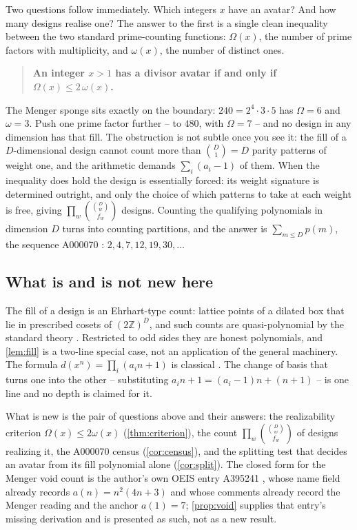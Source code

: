 \documentclass[11pt]{amsart}
\theoremstyle{definition}
\theoremstyle{remark}
\begin{document}
Two questions follow immediately. Which integers $x$ have an avatar? And how many designs realise one? The answer to the first is a single clean inequality between the two standard prime-counting functions: $\Omega(x)$, the number of prime factors with multiplicity, and $\omega(x)$, the number of distinct ones.

\begin{quote}
\textbf{An integer $x>1$ has a divisor avatar if and only if $\Omega(x) \le 2\,\omega(x)$.}
\end{quote}

The Menger sponge sits exactly on the boundary: $240 = 2^{4}\cdot 3 \cdot 5$ has $\Omega = 6$ and $\omega = 3$. Push one prime factor further -- to $480$, with $\Omega = 7$ -- and no design in any dimension has that fill. The obstruction is not subtle once you see it: the fill of a $D$-dimensional design cannot count more than $\binom{D}{1}=D$ parity patterns of weight one, and the arithmetic demands $\sum_{i}(a_{i}-1)$ of them. When the inequality does hold the design is essentially forced: its weight signature is determined outright, and only the choice of which patterns to take at each weight is free, giving $\prod_{w}\binom{\binom{D}{w}}{f_{w}}$ designs. Counting the qualifying polynomials in dimension $D$ turns into counting partitions, and the answer is $\sum_{m \le D} p(m)$, the sequence A000070 \cite{a000070}: $2, 4, 7, 12, 19, 30, \dots$

\subsection*{What is and is not new here}

The fill of a design is an Ehrhart-type count: lattice points of a dilated box that lie in prescribed cosets of $(2\mathbb{Z})^{D}$, and such counts are quasi-polynomial by the standard theory \cite{beckrobins}. Restricted to odd sides they are honest polynomials, and \cref{lem:fill} is a two-line special case, not an application of the general machinery. The formula $d(x^{n}) = \prod_{i}(a_{i}n+1)$ is classical \cite{apostol}. The change of basis that turns one into the other -- substituting $a_{i}n+1 = (a_{i}-1)n + (n+1)$ -- is one line and no depth is claimed for it.

What is new is the pair of questions above and their answers: the realizability criterion $\Omega(x) \le 2\omega(x)$ (\cref{thm:criterion}), the count $\prod_{w}\binom{\binom{D}{w}}{f_{w}}$ of designs realizing it, the A000070 census (\cref{cor:census}), and the splitting test that decides an avatar from its fill polynomial alone (\cref{cor:split}). The closed form for the Menger void count is the author's own OEIS entry A395241 \cite{a395241}, whose name field already records $a(n)=n^{2}(4n+3)$ and whose comments already record the Menger reading and the anchor $a(1)=7$; \cref{prop:void} supplies that entry's missing derivation and is presented as such, not as a new result.
\end{document}
